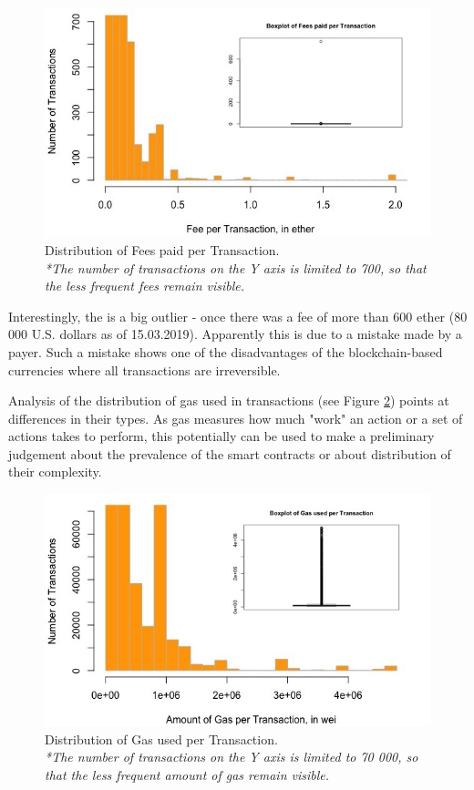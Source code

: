 \begin{figure}[ht]
  \centering
  \includegraphics[width=\linewidth]{figures/fee_per_tx.jpeg}
  \caption{Distribution of Fees paid per Transaction.\\ 
  \textit{*The number of transactions on the Y axis is limited to 700, so that the less frequent fees remain visible.}}
  \label{fig:fee_per_tx}
\end{figure}

Interestingly, the is a big outlier - once there was a fee of more than 600 ether (80 000 U.S. dollars as of 15.03.2019).
Apparently this is due to a mistake made by a payer.
Such a mistake shows one of the disadvantages of the blockchain-based currencies where all transactions are irreversible.

Analysis of the distribution of gas used in transactions (see Figure \ref{fig:gas_per_tx}) points at differences in their types.
As gas measures how much "work" an action or a set of actions takes to perform, this potentially can be used to make a preliminary judgement about the prevalence of the smart contracts or about distribution of their complexity.

\begin{figure}[ht]
  \centering
  \includegraphics[width=\linewidth]{figures/gas_per_tx.jpeg}
  \caption{Distribution of Gas used per Transaction. \\ 
  \textit{*The number of transactions on the Y axis is limited to 70 000, so that the less frequent amount of gas remain visible.}}
  \label{fig:gas_per_tx}
\end{figure}

